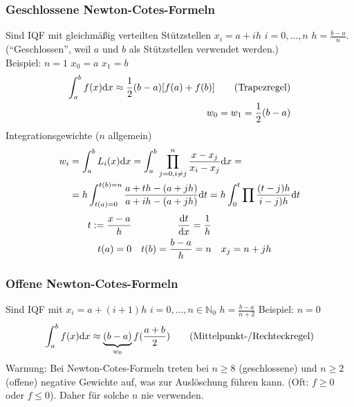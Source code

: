 \subsubsection{Geschlossene Newton-Cotes-Formeln}
Sind IQF mit gleichmäßig verteilten Stützstellen $x_i = a + ih$ $i=0,\ldots,n$ $h=\frac{b-a}{n}$.
(``Geschlossen'', weil $a$ und $b$ als Stützstellen verwendet werden.)\\
Beispiel: $n=1$ $x_0=a$ $x_1=b$
\begin{align*}
  \int_a^b f(x) \mathrm{d}x \approx \frac{1}{2} (b-a)[f(a)+f(b)] \tag{Trapezregel}\\
  w_0 = w_1 = \frac{1}{2} (b-a)
\end{align*}
Integrationsgewichte ($n$ allgemein)
\begin{align*}
  w_i &= \int_a^b L_i(x) \mathrm{d}x = \int_a^b \prod_{j=0,i\neq j}^n \frac{x-x_j}{x_i - x_j}\mathrm{d}x =\\
  &= h \int_{t(a) = 0}^{t(b) = n} \frac{a + th - (a+jh)}{a + ih - (a+jh)} \mathrm{d}t = h \int_0^t \prod \frac{(t-j)h}{i-j)h} \mathrm{d}t
\end{align*}
\begin{align*}
  t:= \frac{x-a}{h} && \frac{\mathrm{d}t}{\mathrm{d}x} = \frac{1}{h} \\
  t(a)=0 && t(b)=\frac{b-a}{h}=n && x_j = n + jh
\end{align*}

\subsubsection{Offene Newton-Cotes-Formeln}
Sind IQF mit $x_i = a + (i+1)h$ $i=0,\ldots,n \in \mathbb{N}_0$
$h=\frac{b-a}{n+2}$
Beispiel: $n=0$
\begin{align*}
  \int_a^b f(x) \mathrm{d}x \approx \underbrace{(b-a)}_{w_0} f(\frac{a+b}{2}) \tag{Mittelpunkt-/Rechteckregel}
\end{align*}
Warnung: Bei Newton-Cotes-Formeln treten bei $n \geq 8$ (geschlossene) und $n \geq 2$ (offene)
negative Gewichte auf, was zur Auslöschung führen kann. (Oft: $f \geq 0$ oder $f \leq 0$).
Daher für solche $n$ nie verwenden.

